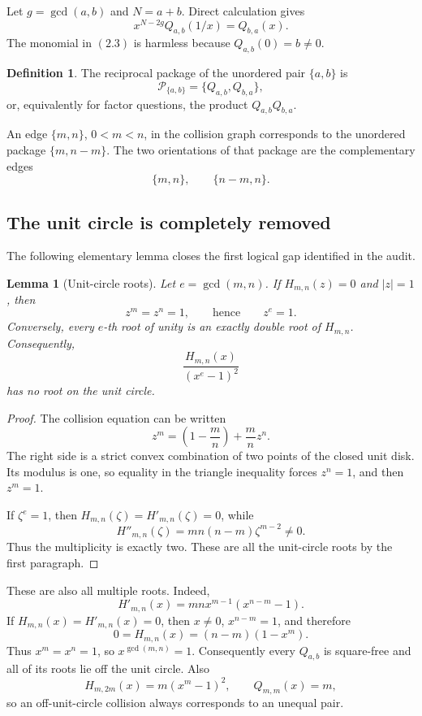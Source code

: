 \documentclass[11pt]{article}
\newtheorem{lemma}[theorem]{Lemma}
\theoremstyle{definition}
\newtheorem{definition}[theorem]{Definition}
\newcommand{\Package}{\mathcal P}
\begin{document}
Let \(g=\gcd(a,b)\) and \(N=a+b\).  Direct calculation gives
\begin{equation}
 x^{N-2g}Q_{a,b}(1/x)=Q_{b,a}(x).
 \tag{2.3}
\end{equation}
The monomial in \((2.3)\) is harmless because \(Q_{a,b}(0)=b\neq0\).

\begin{definition}
The reciprocal package of the unordered pair \(\{a,b\}\) is
\[
 \Package_{\{a,b\}}=\{Q_{a,b},Q_{b,a}\},
\]
or, equivalently for factor questions, the product \(Q_{a,b}Q_{b,a}\).
\end{definition}

An edge \(\{m,n\}\), \(0<m<n\), in the collision graph corresponds to the
unordered package \(\{m,n-m\}\).  The two orientations of that package are the
complementary edges
\[
 \{m,n\},\qquad \{n-m,n\}.
 \tag{2.4}
\]

\subsection{The unit circle is completely removed}

The following elementary lemma closes the first logical gap identified in the
audit.

\begin{lemma}[Unit-circle roots]\label{lem:unitcircle}
Let \(e=\gcd(m,n)\).  If \(H_{m,n}(z)=0\) and \(|z|=1\), then
\[
 z^m=z^n=1,
 \qquad\text{hence}\qquad z^e=1.
\]
Conversely, every \(e\)-th root of unity is an exactly double root of
\(H_{m,n}\).  Consequently,
\[
 \frac{H_{m,n}(x)}{(x^e-1)^2}
\]
has no root on the unit circle.
\end{lemma}

\begin{proof}
The collision equation can be written
\[
 z^m=\left(1-\frac mn\right)+\frac mn z^n.
\]
The right side is a strict convex combination of two points of the closed unit
disk.  Its modulus is one, so equality in the triangle inequality forces
\(z^n=1\), and then \(z^m=1\).

If \(\zeta^e=1\), then \(H_{m,n}(\zeta)=H'_{m,n}(\zeta)=0\), while
\[
 H''_{m,n}(\zeta)
 =mn(n-m)\zeta^{m-2}\neq0.
\]
Thus the multiplicity is exactly two.  These are all the unit-circle roots by
the first paragraph.
\end{proof}

These are also all multiple roots.  Indeed,
\[
 H'_{m,n}(x)=mnx^{m-1}(x^{n-m}-1).
\]
If \(H_{m,n}(x)=H'_{m,n}(x)=0\), then \(x\neq0\),
\(x^{n-m}=1\), and therefore
\[
 0=H_{m,n}(x)=(n-m)(1-x^m).
\]
Thus \(x^m=x^n=1\), so \(x^{\gcd(m,n)}=1\).  Consequently every
\(Q_{a,b}\) is square-free and all of its roots lie off the unit circle.
Also
\[
 H_{m,2m}(x)=m(x^m-1)^2,\qquad Q_{m,m}(x)=m,
\]
so an off-unit-circle collision always corresponds to an unequal pair.
\end{document}
